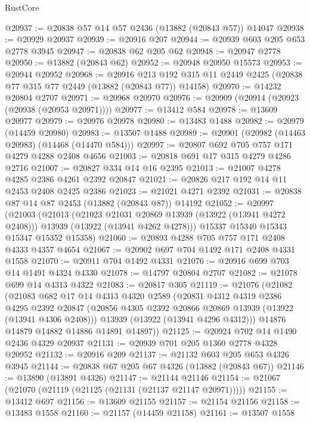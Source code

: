 \begin{lexlean}{RustCore}
\begin{coremodule}
@20937 := @20838 @57 @14 @57 @2436 (@13882 (@20843 @57)) @14047
@20938 := @20929 @20937
@20939 := @20916 @207
@20944 := @20939 @603 @205 @653 @2778 @3945
@20947 := @20838 @62 @205 @62
@20948 := @20947 @2778
@20950 := @13882 (@20843 @62)
@20952 := @20948 @20950 @15573
@20953 := @20944 @20952
@20968 := @20916
    @213
    @192
    @315
    @11
    @2449
    @2425
    (@20838 @77 @315 @77 @2449 (@13882 (@20843 @77)) @14158)
@20970 := @14232 @20804 @2707
@20971 := @20968 @20970
@20976 := @20909 (@20914 (@20923 (@20938 (@20953 @20971))))
@20977 := @13412 @584
@20978 := @13609 @20977
@20979 := @20976 @20978
@20980 := @13483 @1488
@20982 := @20979 (@14459 @20980)
@20983 := @13507 @1488
@20989 := @20901 (@20982 (@14463 @20983) (@14468 (@14470 @584)))
@20997 := @20807 @692 @705 @757 @171 @4279 @4288 @2408 @4656
@21003 := @20818 @691 @17 @315 @4279 @4286 @2716
@21007 := @20827 @334 @14 @16 @2395
@21013 := @21007 @4278 @4285 @2386 @4261 @2392 @20847
@21021 := @20826 @217 @192 @14 @11 @2453 @2408 @2425 @2386
@21023 := @21021 @4271 @2392
@21031 := @20838 @87 @14 @87 @2453 (@13882 (@20843 @87)) @14192
@21052 := @20997
    (@21003
      (@21013
        (@21023 @21031 @20869 @13939 (@13922 (@13941 @4272 @2408)))
        @13939
        (@13922 (@13941 @4262 @4278)))
      @15337
      @15340
      @15343
      @15347
      @15352
      @15358)
@21060 := @20893 @4288 @705 @757 @171 @2408 @4333 @4357 @4654
@21067 := @20902 @697 @704 @1492 @171 @2408 @4331 @1558
@21070 := @20911 @704 @1492 @4331
@21076 := @20916 @699 @703 @14 @1491 @4324 @4330
@21078 := @14797 @20804 @2707
@21082 := @21078 @699 @14 @4313 @4322
@21083 := @20817 @305
@21119 := @21076
    (@21082
      (@21083
        @682
        @17
        @14
        @4313
        @4320
        @2589
        (@20831
          @4312
          @4319
          @2386
          @4295
          @2392
          @20847
          (@20856 @4305 @2392 @20866 @20869 @13939 (@13922 (@13941 @4306 @2408)))
          @13939
          (@13922 (@13941 @4296 @4312)))
        @14876
        @14879
        @14882
        @14886
        @14891
        @14897))
@21125 := @20924 @702 @14 @1490 @2436 @4329 @20937
@21131 := @20939 @701 @205 @1360 @2778 @4328 @20952
@21132 := @20916 @209
@21137 := @21132 @603 @205 @653 @4326 @3945
@21144 := @20838 @67 @205 @67 @4326 (@13882 (@20843 @67))
@21146 := @13890 (@13891 @4326)
@21147 := @21144 @21146
@21154 := @21067 (@21070 (@21119 (@21125 (@21131 (@21137 @21147 @20971)))))
@21155 := @13412 @697
@21156 := @13609 @21155
@21157 := @21154 @21156
@21158 := @13483 @1558
@21160 := @21157 (@14459 @21158)
@21161 := @13507 @1558

\end{coremodule}
\end{lexlean}
